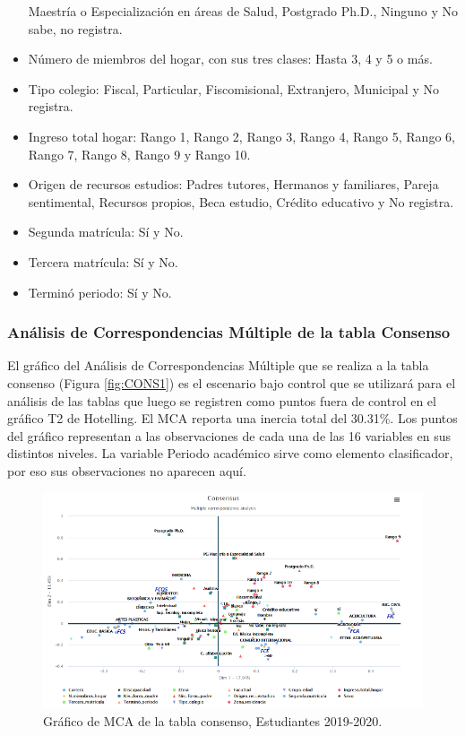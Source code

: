 \documentclass[water,article,submit,moreauthors,pdftex]{mdpi}
\begin{document}
\begin{itemize}
  Maestría o Especialización en áreas de Salud, Postgrado Ph.D., Ninguno
  y No sabe, no registra.
\item
  Número de miembros del hogar, con sus tres clases: Hasta 3, 4 y 5 o
  más.
\item
  Tipo colegio: Fiscal, Particular, Fiscomisional, Extranjero, Municipal
  y No registra.
\item
  Ingreso total hogar: Rango 1, Rango 2, Rango 3, Rango 4, Rango 5,
  Rango 6, Rango 7, Rango 8, Rango 9 y Rango 10.
\item
  Origen de recursos estudios: Padres tutores, Hermanos y familiares,
  Pareja sentimental, Recursos propios, Beca estudio, Crédito educativo
  y No registra.
\item
  Segunda matrícula: Sí y No.
\item
  Tercera matrícula: Sí y No.
\item
  Terminó periodo: Sí y No.
\end{itemize}

\hypertarget{anuxe1lisis-de-correspondencias-muxfaltiple-de-la-tabla-consenso}{%
\subsubsection{Análisis de Correspondencias Múltiple de la tabla
Consenso}\label{anuxe1lisis-de-correspondencias-muxfaltiple-de-la-tabla-consenso}}

El gráfico del Análisis de Correspondencias Múltiple que se realiza a la
tabla consenso (Figura \ref{fig:CONS1}) es el escenario bajo control que
se utilizará para el análisis de las tablas que luego se registren como
puntos fuera de control en el gráfico T2 de Hotelling. El MCA reporta
una inercia total del 30.31\%. Los puntos del gráfico representan a las
observaciones de cada una de las 16 variables en sus distintos niveles.
La variable Periodo académico sirve como elemento clasificador, por eso
sus observaciones no aparecen aquí.

\begin{figure}[!ht]



\begin{center}\includegraphics[width=0.6\linewidth,]{consedu} \end{center}

\caption{Gráfico de MCA de la tabla consenso, Estudiantes 2019-2020.}

\label{fig:CONSedu}
\end{figure}
\end{document}
